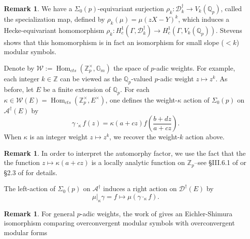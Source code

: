 \documentclass[10pt]{amsart}
\theoremstyle{plain}
\theoremstyle{definition}
\newtheorem{remark}[theorem]{Remark}
\newcommand{\ZZ}{{\mathbb{Z}}}
\newcommand{\QQ}{{\mathbb{Q}}}
\newcommand{\cA}{\mathcal{A}}
\newcommand{\cD}{\mathcal{D}}
\newcommand{\cW}{\mathcal{W}}
\newcommand{\G}{\mathbb{G}}
\DeclareMathOperator{\Hom}{Hom}
\begin{document}
\begin{remark}
We have a $\Sigma_0(p)$-equivariant surjection $\rho_k : \cD_k^\dagger\rightarrow V_k(\QQ_p)$, called the specialization map, defined by $\rho_k(\mu) = \mu( zX-Y)^k$, which induces a Hecke-equivariant homomorphism $\rho_k : H_c^1(\Gamma, \cD^\dagger_k)\rightarrow H^1_c (\Gamma, V_k(\QQ_p))$. Stevens shows \cite{Stevens} that this homomorphism is in fact an isomorphism for small slope ($<k$) modular symbols. 
\end{remark}

Denote by $\cW:=\Hom_{cts}(\ZZ_p^\times,\G_m)$ the space of $p$-adic weights. For example, each integer $k\in\ZZ$ can be viewed as the $\QQ_p$-valued $p$-adic weight $z\mapsto z^k$. As before, let $E$ be a finite extension of $\QQ_p$. For each $\kappa\in \cW(E) =\Hom_{cts}(\ZZ_p^\times,E^\times)$, one defines the weight-$\kappa$ action of $\Sigma_0(p)$ on $\cA^\dagger(E)$ by
\begin{equation*}
	\gamma \cdot_\kappa f(z) = \kappa(a+cz) f\left(\frac{b+dz}{a+cz}\right).
\end{equation*}
When $\kappa$ is an integer weight $z\mapsto z^k$, we recover the weight-$k$ action above.
\begin{remark}
In order to interpret the automorphy factor, we use the fact that the the function $z\mapsto \kappa(a+cz)$ is a locally analytic function on $\ZZ_p$--see \S III.6.1 of \cite{Bellaiche} or \S2.3 of \cite{Robs} for details.
\end{remark}
The left-action of $\Sigma_0(p)$ on $\cA^\dagger$ induces a right action on $\cD^\dagger(E)$ by
\begin{equation*}
	\mu|_\kappa \gamma = f\mapsto \mu( \gamma\cdot_\kappa f).
\end{equation*}
\begin{remark}
For general $p$-adic weights, the work of \cite{Andreatta, Iovita, Stevens} gives an Eichler-Shimura isomorphism comparing overconvergent modular symbols with overconvergent modular forms
\end{remark}
\end{document}
